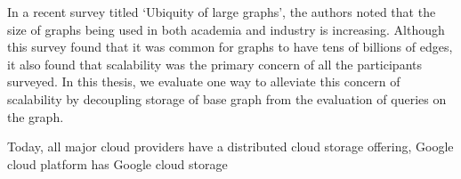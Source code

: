 In a recent survey titled `Ubiquity of large graphs'\cite{sahu2017ubiquity}, the
authors noted that the size of graphs being used in both academia and industry
is increasing. Although this survey found that it was common for graphs to have
tens of billions of edges, it also found that scalability was the primary
concern of all the participants surveyed\cite{sahu2017ubiquity}. In this thesis,
we evaluate one way to alleviate this concern of scalability by decoupling
storage of base graph from the evaluation of queries on the graph.

\medskip
Today, all major cloud providers have a distributed cloud storage offering,
Google cloud platform has Google cloud storage\cite{}
